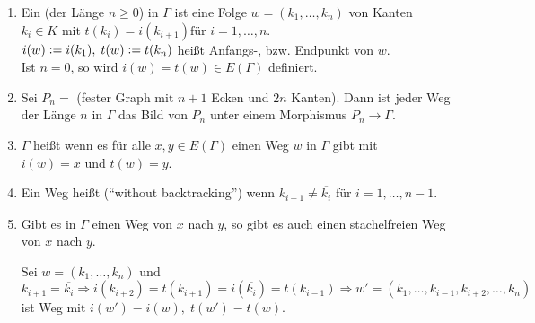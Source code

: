 \documentclass[a4paper, 10pt]{report}
\begin{document}
\begin{DefBem}
\begin{enumerate}
  \item Ein  (der Länge $n \ge 0$) in $\Gamma$ ist eine Folge $w = (k_1,
  \ldots, k_n)$ von Kanten $k_i \in K \textrm{ mit } t(k_i) = i(k_{i+1}) \mbox{
  für }i=1, \ldots, n$.\\
  $i(w) \mathrel{\mathop:}= i(k_1), \; t(w) \mathrel{\mathop:}= t(k_n)$ heißt Anfangs-, bzw. Endpunkt 
  von $w$.\\ Ist $n=0$, so wird $i(w) = t(w) \in E(\Gamma)$ definiert.
  \item Sei $P_n = $
  (fester Graph mit $n+1$ Ecken und $2n$ Kanten).
  Dann ist jeder Weg der Länge $n$ in $\Gamma$ das Bild von $P_n$ unter einem
  Morphismus $P_n \to \Gamma$.
  \item $\Gamma$ heißt  wenn es für alle $x,y \in E(\Gamma)$
  einen Weg $w$ in $\Gamma$ gibt mit $i(w) = x \textrm{ und }t(w) = y$.
  \item Ein Weg heißt  (``without backtracking'') wenn $k_{i+1} \not=
  \overline{k_i}$ für $i=1,\ldots, n-1$.
  \item Gibt es in $\Gamma$ einen Weg von $x$ nach $y$, so gibt es auch einen
  stachelfreien Weg von $x$ nach $y$.
  \begin{Bew}
  Sei $w = (k_1, \ldots, k_n)$ und $k_{i+1} = \overline{k_i} \Rightarrow
  i(k_{i+2}) = t(k_{i+1}) = i(\overline{k_i}) = t(k_{i-1}) \Rightarrow w' =
  (k_1, \ldots, k_{i-1}, k_{i+2}, \ldots, k_n)$ ist Weg mit $i(w') = i(w), \;
  t(w') = t(w)$.
  \end{Bew}
\end{enumerate}  
\end{DefBem}
\end{document}
